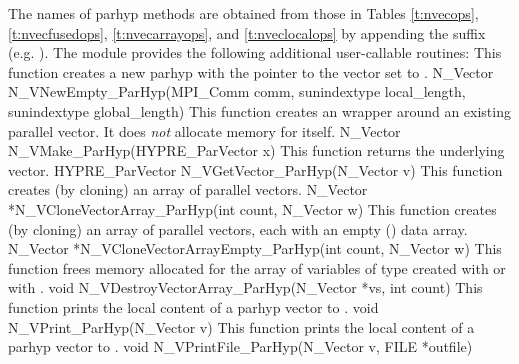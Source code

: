 The names of parhyp methods are obtained from those in Tables \ref{t:nvecops},
\ref{t:nvecfusedops}, \ref{t:nvecarrayops}, and \ref{t:nveclocalops}
by appending the suffix  (e.g. ).
The module {\nvecph} provides the following additional user-callable routines:
{
  This function creates a new parhyp  with the pointer to the {\hypre} 
  vector set to .
}
{
  N\_Vector N\_VNewEmpty\_ParHyp(MPI\_Comm comm, sunindextype local\_length,
  sunindextype global\_length)
}
{  
  This function creates an  wrapper around an existing
  {\hypre} parallel vector. It does {\em not} allocate memory for  
  itself.  
}
{
  N\_Vector N\_VMake\_ParHyp(HYPRE\_ParVector x)
}
{  
  This function returns the underlying {\hypre} vector.
}
{
  HYPRE\_ParVector N\_VGetVector\_ParHyp(N\_Vector v)
}
{ 
  This function creates (by cloning) an array of  parallel vectors.
}
{
  N\_Vector *N\_VCloneVectorArray\_ParHyp(int count, N\_Vector w)
}
{
  This function creates (by cloning) an array of  parallel vectors,
  each with an empty () data array.
}
{
  N\_Vector *N\_VCloneVectorArrayEmpty\_ParHyp(int count, N\_Vector w)
}
{ 
  This function frees memory allocated for the array of   variables of
  type  created with  or with
  .
}
{
  void N\_VDestroyVectorArray\_ParHyp(N\_Vector *vs, int count)
}
{  
  This function prints the local content of a parhyp vector to .
}
{   
  void N\_VPrint\_ParHyp(N\_Vector v)
}
{  
  This function prints the local content of a parhyp vector to .
}
{   
  void N\_VPrintFile\_ParHyp(N\_Vector v, FILE *outfile)
}


